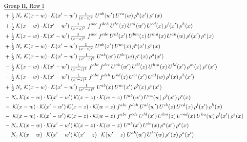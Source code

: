 \documentclass[9pt]{article}
\begin{document}
\begin{align}
&\quad\underline{\text{Group II, Row I}}\notag\\
&\quad +\tfrac{1}{2}\,N_c\;\mathcal{K}(x-w)\cdot\mathcal{K}(x'-w')\,\tfrac{1}{(x-z)^{2}}\;U^{ab}(w')\,U^{ca}(w)\,\rho^{b}(x')\,\rho^{c}(x)\notag\\
&\quad +\tfrac{1}{2}\;\mathcal{K}(x-w)\cdot\mathcal{K}(x'-w')\,\tfrac{1}{(x-z)^{2}}\;f^{abc}\,f^{deh}\,U^{be}(z)\,U^{al}(w')\,U^{cd}(x)\,\rho^{l}(x')\,\rho^{h}(x)\notag\\
&\quad +\tfrac{1}{2}\;\mathcal{K}(x-w)\cdot\mathcal{K}(x'-w')\,\tfrac{1}{(x-z)^{2}}\;f^{abc}\,f^{cde}\,U^{hl}(x')\,U^{bm}(z)\,U^{md}(x)\,U^{ah}(w)\,\rho^{l}(x')\,\rho^{e}(x)\notag\\
&\quad +\tfrac{1}{2}\,N_c\;\mathcal{K}(x-w)\cdot\mathcal{K}(x'-w')\,\tfrac{1}{(x-z)^{2}}\;U^{ab}(x')\,U^{ac}(x)\,\rho^{b}(x')\,\rho^{c}(x)\notag\\
&\quad +\tfrac{1}{2}\,N_c\;\mathcal{K}(x-w)\cdot\mathcal{K}(x'-w')\,\tfrac{1}{(x'-z)^{2}}\;U^{ab}(w')\,U^{bc}(w)\,\rho^{c}(x)\,\rho^{a}(x')\notag\\
&\quad -\tfrac{1}{2}\;\mathcal{K}(x-w)\cdot\mathcal{K}(x'-w')\,\tfrac{1}{(x'-z)^{2}}\;f^{abc}\,f^{dce}\,U^{ah}(w')\,U^{bl}(z)\,U^{hm}(x)\,U^{ld}(x')\,\rho^{m}(x)\,\rho^{e}(x')\notag\\
&\quad -\tfrac{1}{2}\;\mathcal{K}(x-w)\cdot\mathcal{K}(x'-w')\,\tfrac{1}{(x'-z)^{2}}\;f^{abc}\,f^{deh}\,U^{bd}(z)\,U^{ce}(x')\,U^{al}(w)\,\rho^{l}(x)\,\rho^{h}(x')\notag\\
&\quad +\tfrac{1}{2}\,N_c\;\mathcal{K}(x-w)\cdot\mathcal{K}(x'-w')\,\tfrac{1}{(x'-z)^{2}}\;U^{ab}(x)\,U^{ac}(x')\,\rho^{b}(x)\,\rho^{c}(x')\notag\\
&\quad -N_c\;\mathcal{K}(x-w)\cdot\mathcal{K}(x'-w')\,\mathcal{K}(x-z)\cdot\mathcal{K}(w-z)\;U^{ab}(w')\,U^{ca}(w)\,\rho^{b}(x')\,\rho^{c}(x)\notag\\
&\quad -\;\mathcal{K}(x-w)\cdot\mathcal{K}(x'-w')\,\mathcal{K}(x-z)\cdot\mathcal{K}(w-z)\;f^{abc}\,f^{deh}\,U^{al}(w')\,U^{eb}(z)\,U^{cd}(x)\,\rho^{l}(x')\,\rho^{h}(x)\notag\\
&\quad -\;\mathcal{K}(x-w)\cdot\mathcal{K}(x'-w')\,\mathcal{K}(x-z)\cdot\mathcal{K}(w-z)\;f^{abc}\,f^{cde}\,U^{hl}(x')\,U^{bm}(z)\,U^{md}(x)\,U^{ha}(w)\,\rho^{l}(x')\,\rho^{e}(x)\notag\\
&\quad -N_c\;\mathcal{K}(x-w)\cdot\mathcal{K}(x'-w')\,\mathcal{K}(x-z)\cdot\mathcal{K}(w-z)\;U^{ab}(x')\,U^{bc}(x)\,\rho^{a}(x')\,\rho^{c}(x)\notag\\
&\quad -N_c\;\mathcal{K}(x-w)\cdot\mathcal{K}(x'-w')\,\mathcal{K}(x'-z)\cdot\mathcal{K}(w'-z)\;U^{ab}(w')\,U^{bc}(w)\,\rho^{c}(x)\,\rho^{a}(x')\notag\\

\end{align}
\end{document}
